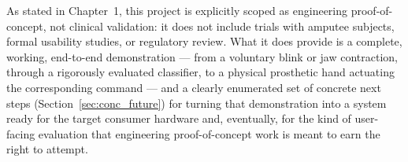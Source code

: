 As stated in Chapter~1, this project is explicitly scoped as
engineering proof-of-concept, not clinical validation: it does not
include trials with amputee subjects, formal usability studies, or
regulatory review. What it does provide is a complete, working,
end-to-end demonstration --- from a voluntary blink or jaw
contraction, through a rigorously evaluated classifier, to a
physical prosthetic hand actuating the corresponding command --- and
a clearly enumerated set of concrete next steps
(Section~\ref{sec:conc_future}) for turning that demonstration into
a system ready for the target consumer hardware and, eventually, for
the kind of user-facing evaluation that engineering proof-of-concept
work is meant to earn the right to attempt.